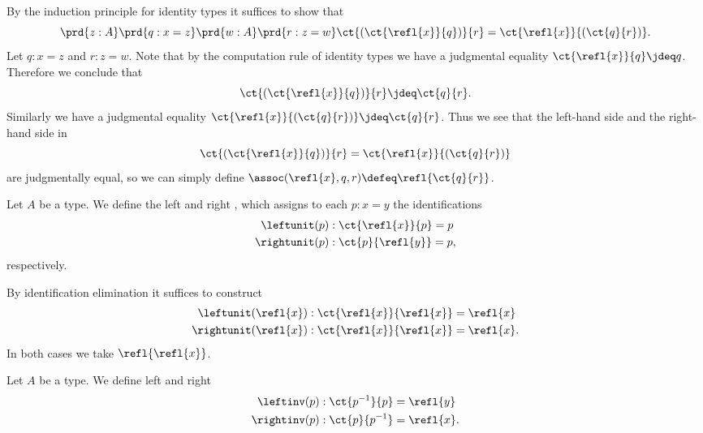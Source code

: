 \begin{constr}
By the induction principle for identity types it suffices to show that
\begin{equation*}
\prd{z:A}\prd{q:x=z}\prd{w:A}\prd{r:z=w} \ct{(\ct{\refl{x}}{q})}{r}= \ct{\refl{x}}{(\ct{q}{r})}.
\end{equation*}
Let $q:x=z$ and $r:z=w$. Note that by the computation rule of identity types we have a judgmental equality $\ct{\refl{x}}{q}\jdeq q$. Therefore we conclude that
\begin{equation*}
  \ct{(\ct{\refl{x}}{q})}{r}\jdeq \ct{q}{r}.
\end{equation*}
Similarly we have a judgmental equality $\ct{\refl{x}}{(\ct{q}{r})}\jdeq \ct{q}{r}$. Thus we see that the left-hand side and the right-hand side in
\begin{equation*}
  \ct{(\ct{\refl{x}}{q})}{r}=\ct{\refl{x}}{(\ct{q}{r})}
\end{equation*}
are judgmentally equal, so we can simply define $\assoc(\refl{x},q,r)\defeq\refl{\ct{q}{r}}$.
\end{constr}

\begin{defn}\label{defn:id_unit}
Let $A$ be a type. We define the left and right , which assigns to each $p:x=y$ the identifications
\begin{align*}
\leftunit(p) & : \ct{\refl{x}}{p}=p \\
\rightunit(p) & : \ct{p}{\refl{y}}=p,
\end{align*}
respectively.
\end{defn}

\begin{constr}
By identification elimination it suffices to construct
\begin{align*}
\leftunit(\refl{x}) & : \ct{\refl{x}}{\refl{x}} = \refl{x} \\
\rightunit(\refl{x}) & : \ct{\refl{x}}{\refl{x}} = \refl{x}.
\end{align*}
In both cases we take $\refl{\refl{x}}$.
\end{constr}

\begin{defn}\label{defn:id_invlaw}
Let $A$ be a type. We define left and right 
\begin{align*}
\leftinv(p) & : \ct{p^{-1}}{p} = \refl{y} \\
\rightinv(p) & : \ct{p}{p^{-1}} = \refl{x}.
\end{align*}
\end{defn}

